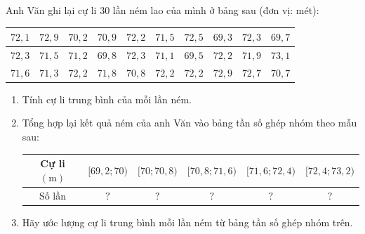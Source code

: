 \begin{vd}%
	Anh Văn ghi lại cự li 30 lần ném lao của mình ở bảng sau (đơn vị: mét):
	\begin{center}
		\begin{tabular}{|c|c|c|c|c|c|c|c|c|c|}
			\hline $72{,}1$ & $72{,}9$ & $70{,}2$ & $70{,}9$ & $72{,}2$ & $71{,}5$ & $72{,}5$ & $69{,}3$ & $72{,}3$ & $69{,}7$ \\
			\hline $72{,}3$ & $71{,}5$ & $71{,}2$ & $69{,}8$ & $72{,}3$ & $71{,}1$ & $69{,}5$ & $72{,}2$ & $71{,}9$ & $73{,}1$ \\
			\hline $71{,}6$ & $71{,}3$ & $72{,}2$ & $71{,}8$ & $70{,}8$ & $72{,}2$ & $72{,}2$ & $72{,}9$ & $72{,}7$ & $70{,}7$ \\
			\hline
		\end{tabular}
	\end{center}
	\begin{enumerate}
		\item Tính cự li trung bình của mỗi lần ném.
		\item Tổng hợp lại kết quả ném của anh Văn vào bảng tần số ghép nhóm theo mẫu sau:
		\begin{center}
			\begin{tabular}{|c|c|c|c|c|c|}
				\hline Cự li $(\mathrm{m})$ &{$[69{,}2; 70)$} &{$[70; 70{,}8)$} &{$[70{,}8; 71{,}6)$} &{$[71{,}6; 72{,}4)$} &{$[72{,}4; 73{,}2)$} \\
				\hline Số lần & $?$ & $?$ & $?$ & $?$ & $?$ \\
				\hline
			\end{tabular}
		\end{center}
		\item Hãy ước lượng cự li trung bình mỗi lần ném từ bảng tần số ghép nhóm trên.
	\end{enumerate}
\end{vd}
